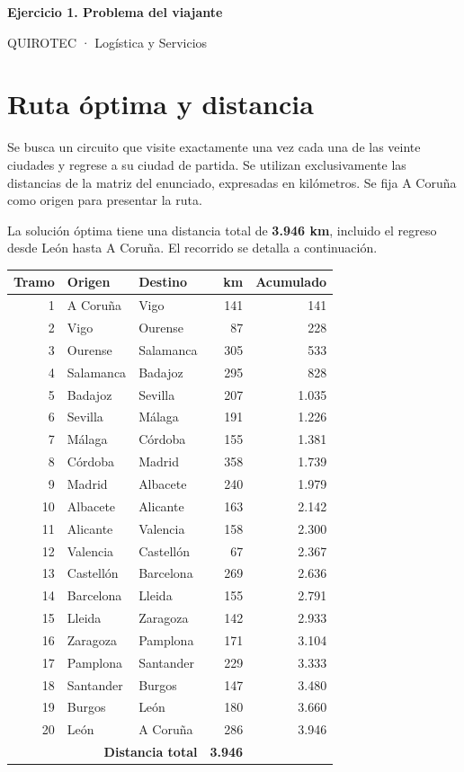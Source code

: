\documentclass[11pt,a4paper]{article}
\begin{document}
\begin{center}{\Large\bfseries Ejercicio 1. Problema del viajante}\par
QUIROTEC · Logística y Servicios\end{center}
\section*{Ruta óptima y distancia}
Se busca un circuito que visite exactamente una vez cada una de las veinte ciudades
y regrese a su ciudad de partida. Se utilizan exclusivamente las distancias de la matriz
del enunciado, expresadas en kilómetros. Se fija A Coruña como origen para presentar la ruta.

La solución óptima tiene una distancia total de \textbf{3.946 km}, incluido el regreso
desde León hasta A Coruña. El recorrido se detalla a continuación.

\begin{center}\small
\begin{tabular}{rllrr}\toprule
Tramo & Origen & Destino & km & Acumulado \\\midrule
1 & A Coruña & Vigo & 141 & 141 \\
2 & Vigo & Ourense & 87 & 228 \\
3 & Ourense & Salamanca & 305 & 533 \\
4 & Salamanca & Badajoz & 295 & 828 \\
5 & Badajoz & Sevilla & 207 & 1.035 \\
6 & Sevilla & Málaga & 191 & 1.226 \\
7 & Málaga & Córdoba & 155 & 1.381 \\
8 & Córdoba & Madrid & 358 & 1.739 \\
9 & Madrid & Albacete & 240 & 1.979 \\
10 & Albacete & Alicante & 163 & 2.142 \\
11 & Alicante & Valencia & 158 & 2.300 \\
12 & Valencia & Castellón & 67 & 2.367 \\
13 & Castellón & Barcelona & 269 & 2.636 \\
14 & Barcelona & Lleida & 155 & 2.791 \\
15 & Lleida & Zaragoza & 142 & 2.933 \\
16 & Zaragoza & Pamplona & 171 & 3.104 \\
17 & Pamplona & Santander & 229 & 3.333 \\
18 & Santander & Burgos & 147 & 3.480 \\
19 & Burgos & León & 180 & 3.660 \\
20 & León & A Coruña & 286 & 3.946 \\
\midrule
\multicolumn{3}{r}{\textbf{Distancia total}} & \textbf{3.946} & \\
\bottomrule\end{tabular}\end{center}
\end{document}
